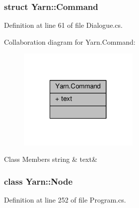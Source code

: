 \subsubsection{struct Yarn\-:\-:Command}


Definition at line 61 of file Dialogue.\-cs.



Collaboration diagram for Yarn.\-Command\-:
\nopagebreak
\begin{figure}[H]
\begin{center}
\leavevmode
\includegraphics[width=164pt]{a00392}
\end{center}
\end{figure}
\begin{DoxyFields}{Class Members}
\hypertarget{a00051_a8564e5104566e145f5d917ec846444d9}{string}\label{a00051_a8564e5104566e145f5d917ec846444d9}
&
text&
\\
\hline

\end{DoxyFields}
\label{a00379}
\hypertarget{a00051_a00379}{}
\subsubsection{class Yarn\-:\-:Node}


Definition at line 252 of file Program.\-cs.



